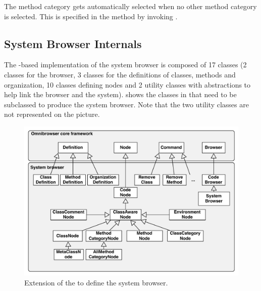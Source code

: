 \documentclass[a4paper,10pt,twoside]{book}
\begin{document}
The  method category gets automatically selected when no other method category is selected. This is specified in the  method by invoking .

\subsection{System Browser Internals}
The \ob-based implementation of the \pharo system browser is composed of 17 classes (2 classes for the browser, 3 classes for the definitions of classes, methods and organization, 10 classes defining nodes and 2 utility classes with abstractions to help link the browser and the system).  shows the classes in \obf that need to be subclassed to produce the system browser. Note that the two utility classes are not represented on the picture.





\begin{figure}[!ht]
\begin{center}
\includegraphics[scale=0.55]{obInternal.pdf}
\caption{Extension of the \obf to define the system browser.} 
\end{center}
\end{figure}
\end{document}
